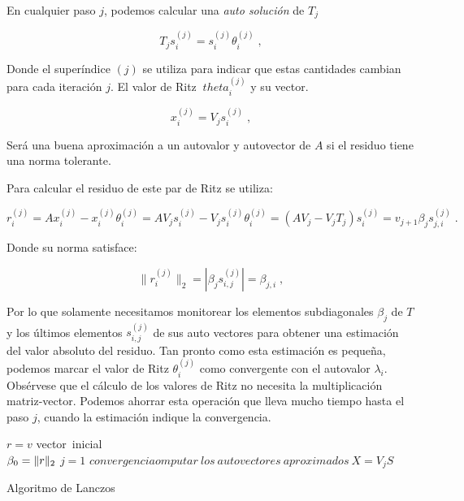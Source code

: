 \documentclass[a4paper,openright,12pt, oneside]{book}
\DeclarePairedDelimiter\norm{\lVert}{\rVert}
\begin{document}
En cualquier paso $ j $, podemos calcular una \emph{auto soluci\'on} de $ T_{j} $

\begin{equation}
T_{j}s_i^{(j)}=s_i^{(j)}\theta_i^{(j)}\;,
\end{equation}

Donde el super\'indice $ (j) $ se utiliza para indicar que estas cantidades cambian para cada iteraci\'on $ j $. El valor de Ritz $ \ theta_i ^ {(j)} $ y su vector.

\begin{equation}
x_i^{(j)}=V_js_i^{(j)}\;,
\end{equation}

Ser\'a una buena aproximaci\'on a un autovalor y autovector de $ A $ si el residuo tiene una norma tolerante.

Para calcular el residuo de este par de Ritz se utiliza:

\begin{displaymath}
r_i^{(j)}=Ax_i^{(j)}-x_i^{(j)}\theta_i^{(j)}
=AV_js_i^{(j)}-V_js_i^{(j)}\theta_i^{(j)}=(AV_j-V_jT_{j})s_i^{(j)}=
v_{j+1}\beta_js_{j,i}^{(j)}\;.
\end{displaymath}

Donde su norma satisface:

\begin{equation}
\|r_i^{(j)}\|_2=|\beta_js_{i,j}^{(j)}|=\beta_{j,i}\;,
\end{equation}

Por lo que solamente necesitamos monitorear los elementos subdiagonales $ \beta_j $ de $ T $ y los \'ultimos elementos $ s_{i, j} ^ {(j)} $ de sus auto vectores para obtener una estimaci\'on del valor absoluto del residuo. Tan pronto como esta estimaci\'on es peque\~na, podemos marcar el valor de Ritz $ \theta_i ^ {(j)} $ como convergente con el autovalor $ \lambda_i $. Obs\'ervese que el c\'alculo de los valores de Ritz no necesita la multiplicaci\'on matriz-vector. Podemos ahorrar esta operaci\'on que lleva mucho tiempo hasta el paso $ j $, cuando la estimaci\'on indique la convergencia.

\begin{algorithm}
    \label{lanczosalgorithm}
    ${r} = v$ vector\ inicial\\
    $\beta_0 = \norm{r}_2$
    $j = 1$
    $convergenciaomputar\ los\ autovectores\ aproximados\ X= V_jS$
    

    \caption{Algoritmo de Lanczos}
\end{algorithm}
\end{document}
